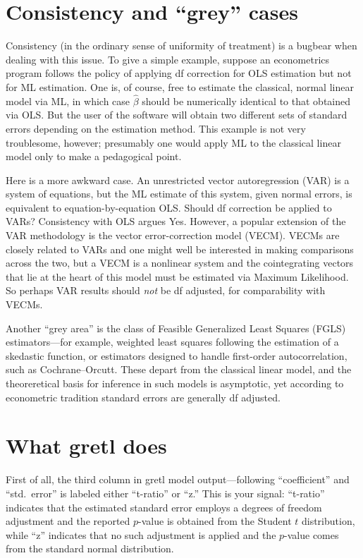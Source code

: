 \section{Consistency and ``grey'' cases}
\label{sec:df-grey}

Consistency (in the ordinary sense of uniformity of treatment) is a
bugbear when dealing with this issue.  To give a simple example,
suppose an econometrics program follows the policy of applying df
correction for OLS estimation but not for ML estimation.  One is, of
course, free to estimate the classical, normal linear model via ML, in
which case $\hat\beta$ should be numerically identical to that
obtained via OLS.  But the user of the software will obtain two
different sets of standard errors depending on the estimation method.
This example is not very troublesome, however; presumably one would
apply ML to the classical linear model only to make a pedagogical
point.

Here is a more awkward case.  An unrestricted vector autoregression
(VAR) is a system of equations, but the ML estimate of this system,
given normal errors, is equivalent to equation-by-equation OLS.
Should df correction be applied to VARs? Consistency with OLS argues
Yes. However, a popular extension of the VAR methodology is the vector
error-correction model (VECM).  VECMs are closely related to VARs and
one might well be interested in making comparisons across the two, but
a VECM is a nonlinear system and the cointegrating vectors that lie at
the heart of this model must be estimated via Maximum Likelihood.  So
perhaps VAR results should \textit{not} be df adjusted, for
comparability with VECMs.

Another ``grey area'' is the class of Feasible Generalized Least
Squares (FGLS) estimators---for example, weighted least squares
following the estimation of a skedastic function, or estimators
designed to handle first-order autocorrelation, such as
Cochrane--Orcutt.  These depart from the classical linear model, and
the theoreretical basis for inference in such models is asymptotic,
yet according to econometric tradition standard errors are generally
df adjusted.

\section{What gretl does}
\label{sec:df-policy}

First of all, the third column in gretl model output---following
``coefficient'' and ``std.\ error'' is labeled either ``t-ratio'' or
``z.'' This is your signal: ``t-ratio'' indicates that the estimated
standard error employs a degrees of freedom adjustment and the
reported $p$-value is obtained from the Student $t$ distribution,
while ``z'' indicates that no such adjustment is applied and the
$p$-value comes from the standard normal distribution.

